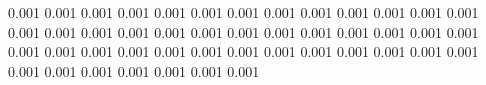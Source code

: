 0.001      0.001      %
0.001      0.001      %
0.001      0.001      %
0.001      0.001      %
0.001      0.001      %
0.001      0.001      %
0.001      0.001      %
0.001      0.001      %
0.001      0.001      %
0.001      0.001      %
0.001      0.001      %
0.001      0.001      %
0.001      0.001      %
0.001      0.001      %
0.001      0.001      %
0.001      0.001      %
0.001      0.001      %
0.001      0.001      %
0.001      0.001      %
0.001      0.001      %
0.001      0.001      %
0.001      0.001      %
0.001      0.001      %
